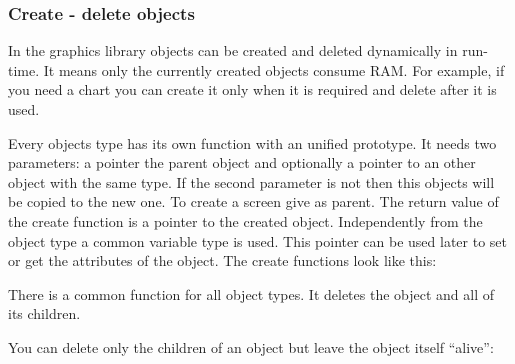 \documentclass[letterpaper,10pt,english]{sphinxmanual}
\begin{document}
\subsubsection{Create - delete objects}
\label{\detokenize{overview/objects:create-delete-objects}}
In the graphics library objects can be created and deleted dynamically in run-time. It means only the currently created objects consume RAM. For example, if you need a chart you can create it only when it is required and delete after it is used.

Every objects type has its own  function with an unified prototype. It needs two parameters: a pointer the parent object and optionally a pointer to an other object with the same type. If the second parameter is not  then this objects will be copied to the new one. To create a screen give  as parent. The return value of the create function is a pointer to the created object. Independently from the object type a common variable type  is used. This pointer can be used later to set or get the attributes of the object. The create functions look like this:

%
\begin{sphinxVerbatim}[commandchars=\\\{\}]
       
\end{sphinxVerbatim}

There is a common  function for all object types. It deletes the object and all of its children.

%
\begin{sphinxVerbatim}[commandchars=\\\{\}]
   
\end{sphinxVerbatim}

You can delete only the children of an object but leave the object itself “alive”:

%
\begin{sphinxVerbatim}[commandchars=\\\{\}]
   
\end{sphinxVerbatim}
\end{document}
